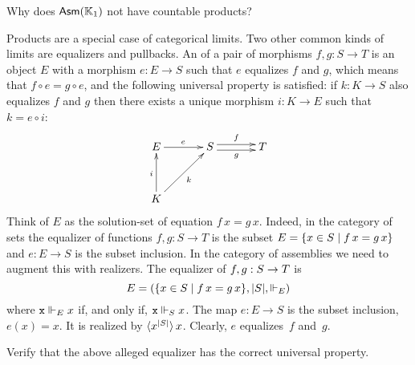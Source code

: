 \begin{exercise}
  Why does $\Asm{\klone}$ not have countable products?
\end{exercise}

Products are a special case of categorical limits. Two other common
kinds of limits are equalizers and pullbacks. An  of a
pair of morphisms $f, g : S \to T$ is an object $E$ with a morphism $e
: E \to S$ such that $e$ equalizes $f$ and $g$, which means that $f
\circ e = g \circ e$, and the following universal property is
satisfied: if $k : K \to S$ also equalizes $f$ and $g$ then there
exists a unique morphism $i : K \to E$ such that $k = e \circ i$:
%
\begin{equation*}
  \xymatrix@+1em{
    {E}
    \ar[r]^{e}
    &
    {S}
    \ar@<+0.25em>[r]^{f}
    \ar@<-0.25em>[r]_{g}
    &
    {T}
    \\
    {K}
    \ar[u]^{i}
    \ar[ru]_{k}
    & & 
  }
\end{equation*}
%
Think of $E$ as the solution-set of equation $f\,x =
g\,x$.
%
Indeed, in the category of sets the equalizer of functions $f, g : S
\to T$ is the subset $E = \set{x \in S \such f\,x = g\,x}$ and $e : E
\to S$ is the subset inclusion. In the category of assemblies we need
to augment this with realizers. The equalizer of $f, g : \asm{S} \to
\asm{T}$ is
%
\begin{equation}
  \label{eq:asm-equalizer}%
  \asm{E} =
  (\set{x \in S \such f\,x = g\,x},
   |S|,
   {\rz[E]})
\end{equation}
%
where $\R{x} \rz[E] x$ if, and only if, $\R{x} \rz[S] x$. The map $e : E
\to S$ is the subset inclusion, $e(x) = x$. It is realized by
$\tpcalam{x}{|S|} x$. Clearly, $e$ equalizes~$f$ and~$g$.

\begin{exercise}
  Verify that the above alleged equalizer has the correct universal property.
\end{exercise}

